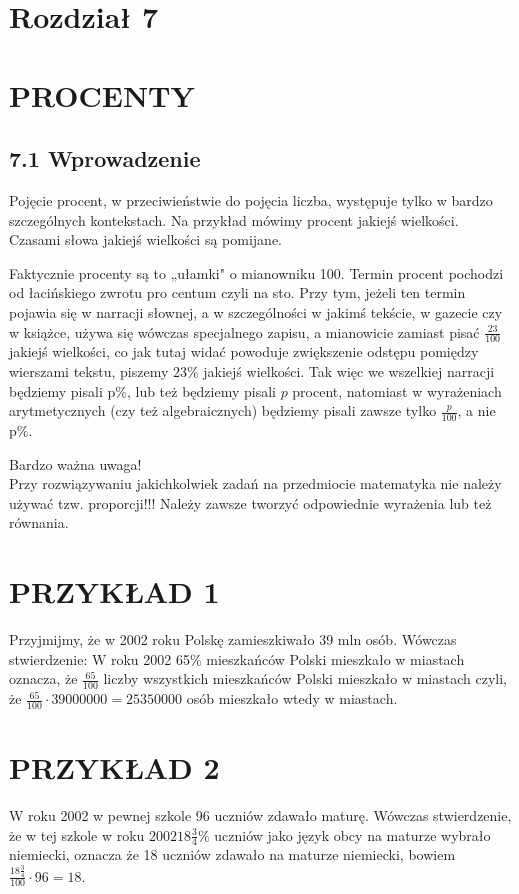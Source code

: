 \documentclass[10pt]{article}
\begin{document}
\section*{Rozdział 7}
\section*{PROCENTY}
\subsection*{7.1 Wprowadzenie}
Pojęcie procent, w przeciwieństwie do pojęcia liczba, występuje tylko w bardzo szczególnych kontekstach. Na przykład mówimy procent jakiejś wielkości. Czasami słowa jakiejś wielkości są pomijane.

Faktycznie procenty są to „ułamki" o mianowniku 100. Termin procent pochodzi od łacińskiego zwrotu pro centum czyli na sto. Przy tym, jeżeli ten termin pojawia się w narracji słownej, a w szczególności w jakimś tekście, w gazecie czy w książce, używa się wówczas specjalnego zapisu, a mianowicie zamiast pisać \(\frac{23}{100}\) jakiejś wielkości, co jak tutaj widać powoduje zwiększenie odstępu pomiędzy wierszami tekstu, piszemy \(23 \%\) jakiejś wielkości. Tak więc we wszelkiej narracji będziemy pisali \(\mathrm{p} \%\), lub też będziemy pisali \(p\) procent, natomiast w wyrażeniach arytmetycznych (czy też algebraicznych) będziemy pisali zawsze tylko \(\frac{p}{100}\), a nie p\%.

Bardzo ważna uwaga!\\
Przy rozwiązywaniu jakichkolwiek zadań na przedmiocie matematyka nie należy używać tzw. proporcji!!! Należy zawsze tworzyć odpowiednie wyrażenia lub też równania.

\section*{PRZYKŁAD 1}
Przyjmijmy, że w 2002 roku Polskę zamieszkiwało 39 mln osób. Wówczas stwierdzenie: W roku 2002 65\% mieszkańców Polski mieszkało w miastach oznacza, że \(\frac{65}{100}\) liczby wszystkich mieszkańców Polski mieszkało w miastach czyli, że \(\frac{65}{100} \cdot 39000000=25350000\) osób mieszkało wtedy w miastach.

\section*{PRZYKŁAD 2}
W roku 2002 w pewnej szkole 96 uczniów zdawało maturę. Wówczas stwierdzenie, że w tej szkole w roku \(200218 \frac{3}{4} \%\) uczniów jako język obcy na maturze wybrało niemiecki, oznacza że 18 uczniów zdawało na maturze niemiecki, bowiem \(\frac{18 \frac{3}{4}}{100} \cdot 96=18\).
\end{document}
